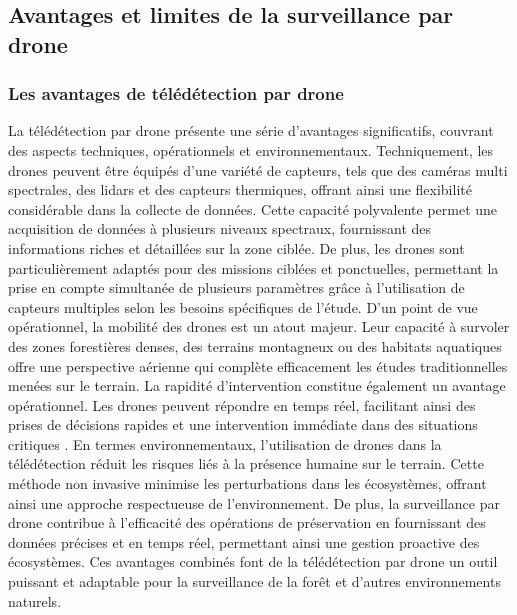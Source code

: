 \subsection{Avantages et limites de la surveillance par drone}
\subsubsection{Les avantages de télédétection par drone}
La télédétection par drone présente une série d'avantages significatifs, couvrant des aspects techniques, opérationnels et environnementaux. Techniquement, les drones peuvent être équipés d'une variété de capteurs, tels que des caméras multi spectrales, des lidars et des capteurs thermiques, offrant ainsi une flexibilité considérable dans la collecte de données. Cette capacité polyvalente permet une acquisition de données à plusieurs niveaux spectraux, fournissant des informations riches et détaillées sur la zone ciblée. De plus, les drones sont particulièrement adaptés pour des missions ciblées et ponctuelles, permettant la prise en compte simultanée de plusieurs paramètres grâce à l'utilisation de capteurs multiples selon les besoins spécifiques de l'étude. D'un point de vue opérationnel, la mobilité des drones est un atout majeur. Leur capacité à survoler des zones forestières denses, des terrains montagneux ou des habitats aquatiques offre une perspective aérienne qui complète efficacement les études traditionnelles menées sur le terrain. La rapidité d'intervention constitue également un avantage opérationnel. Les drones peuvent répondre en temps réel, facilitant ainsi des prises de décisions rapides et une intervention immédiate dans des situations critiques \cite{50}.
En termes environnementaux, l'utilisation de drones dans la télédétection réduit les risques liés à la présence humaine sur le terrain. Cette méthode non invasive minimise les perturbations dans les écosystèmes, offrant ainsi une approche respectueuse de l'environnement. De plus, la surveillance par drone contribue à l'efficacité des opérations de préservation en fournissant des données précises et en temps réel, permettant ainsi une gestion proactive des écosystèmes. Ces avantages combinés font de la télédétection par drone un outil puissant et adaptable pour la surveillance de la forêt et d'autres environnements naturels.

